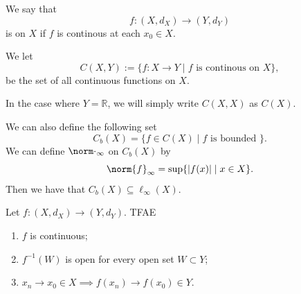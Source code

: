 \documentclass[notoc,notitlepage]{tufte-book}
\begin{document}
\begin{defn}\label{defn:continuity_on_a_space}
  We say that
  \begin{equation*}
    f : (X, d_X) \to (Y, d_Y)
  \end{equation*}
  is  on $X$ if $f$ is continous at each $x_0 \in X$.
  
  We let
  \begin{equation*}
    C(X, Y) := \{ f : X \to Y \mid f \text{ is continous on } X \},
  \end{equation*}
  be the set of all continuous functions on $X$.
\end{defn}

\begin{note}
  In the case where $Y = \mathbb{R}$, we will simply write $C(X, X)$ as $C(X)$.
\end{note}

\begin{remark}
  We can also define the following set
  \begin{equation*}
    C_b(X) = \{ f \in C(X) \mid f \text{ is bounded } \}.
  \end{equation*}
  We can define $\norm\cdot_\infty$ on $C_b(X)$ by
  \begin{equation*}
    \norm{f}_\infty = \sup \{ \abs{ f(x) } \mid x \in X \}.
  \end{equation*}
  Then we have that $C_b(X) \subseteq \ell_\infty(X)$.
\end{remark}

\begin{thm}\label{thm:analogue_of_sequential_characterization_of_continuity_on_a_space_and_continuity_and_neighbourhoods}
  Let $f: (X, d_X) \to (Y, d_Y)$. TFAE
  \begin{enumerate}
    \item $f$ is continuous;
    \item $f^{-1}(W)$ is open for every open set $W \subset Y$;
    \item $x_n \to x_0 \in X \implies f(x_n) \to f(x_0) \in Y$.
  \end{enumerate}
\end{thm}
\end{document}
